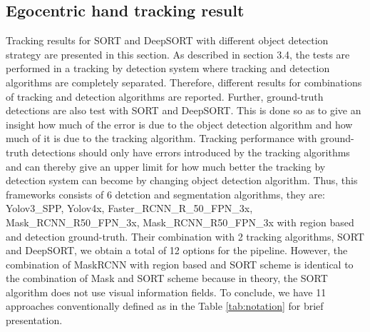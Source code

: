 \subsection{Egocentric hand tracking result}
Tracking results for SORT and DeepSORT with different object detection strategy are presented in this section. As described in section 3.4, the tests are performed in a tracking by detection system where tracking and detection algorithms are completely separated. Therefore, different results for combinations of tracking and detection algorithms are reported. Further, ground-truth detections are also test with SORT and DeepSORT. This is done so as to give an insight how much of the error is due to the object detection algorithm and how much of it is due to the tracking algorithm. Tracking performance with ground-truth detections should only have errors introduced by the tracking algorithms and can thereby give an upper limit for how much better the tracking by detection system can become by changing object detection algorithm. Thus, this frameworks consists of 6 detction and segmentation algorithms, they are: Yolov3\_SPP, Yolov4x, Faster\_RCNN\_R\_50\_FPN\_3x, Mask\_RCNN\_R50\_FPN\_3x, Mask\_RCNN\_R50\_FPN\_3x with region based and detection ground-truth. Their combination with 2 tracking algorithms, SORT and DeepSORT, we obtain a total of 12 options for the pipeline. However, the combination of MaskRCNN with region based and SORT scheme is identical to the combination of Mask and SORT scheme because in theory, the SORT algorithm does not use visual information fields. To conclude, we have 11 approaches conventionally defined as in the Table \ref{tab:notation} for brief presentation.
